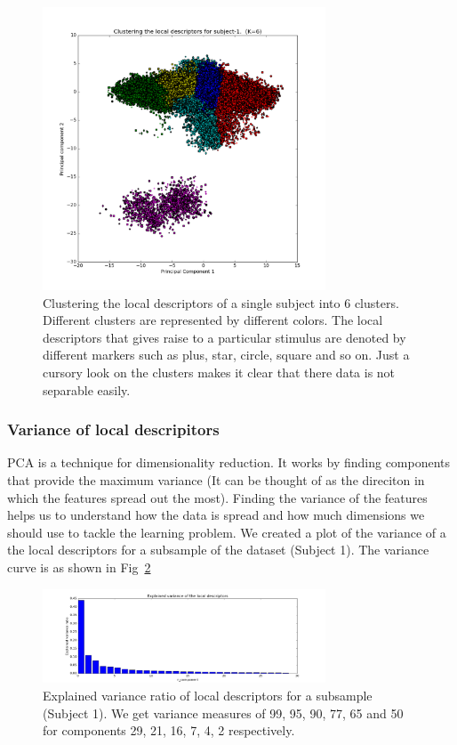 \documentclass[final,leqno,onefignum,onetabnum]{siamltexmm}
\begin{document}
\begin{figure}
  \centering
  \includegraphics[width=0.75\textwidth]{images/cluster_centers}
  \caption{Clustering the local descriptors of a single subject into 6 clusters.  Different clusters are represented by different colors.  The local descriptors that gives raise to a particular stimulus are denoted by different markers such as plus, star, circle, square and so on.  Just a cursory look on the clusters makes it clear that there data is not separable easily.\label{fig:local_descriptors_clusters}} 
\end{figure}

\subsubsection{Variance of local descripitors}
PCA is a technique for dimensionality reduction.  
It works by finding components that provide the maximum variance (It can be thought of as the direciton in which the features spread out the most).
Finding the variance of the features helps us to understand how the data is spread and how much dimensions we should use to tackle the learning problem.  
We created a plot of the variance of a the local descriptors for a subsample of the dataset (Subject 1).  
The variance curve is as shown in Fig~\ref{fig:ld_variance}

\begin{figure}
  \centering
  \includegraphics[width=0.75\textwidth]{images/ld_variance}
  \caption{Explained variance ratio of local descriptors for a subsample (Subject 1).  We get variance measures of 99, 95, 90, 77, 65 and 50 for components 29, 21, 16, 7, 4, 2 respectively.\label{fig:ld_variance}} 
\end{figure}
\end{document}
